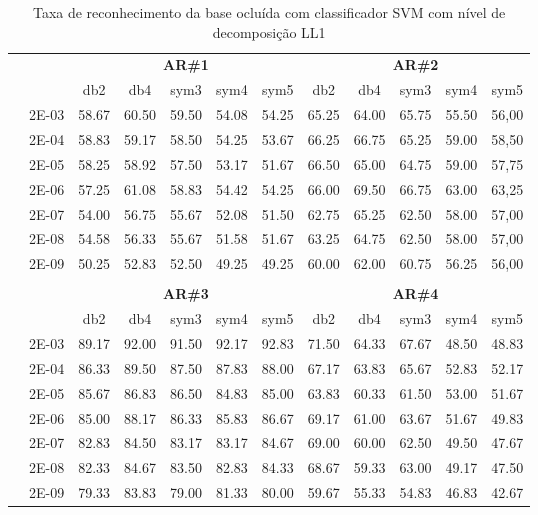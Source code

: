 \begin{table}[H]
	\centering
    \normalsize
	\caption{Taxa de reconhecimento da base ocluída com classificador SVM com nível de decomposição LL1}
	\begin{tabular}{|c|c|c c c c c|c c c c c|}
\cline{3-12}
\multicolumn{2}{c|}{\multirow{2}{*}{}} & \multicolumn{5}{c|}{\textbf{AR\#1}}  & \multicolumn{5}{c|}{\textbf{AR\#2}} \\\cline{3-12}

\multicolumn{2}{c|}{}  & db2 & db4 & sym3 & sym4 & sym5 & db2 & db4& sym3 & sym4 & sym5 \\\hline
\multicolumn{1}{|c|}{ \multirow{6}{*}{\rotatebox[origin=c]{90}{\textbf{Gamma}}} }
&2E-03&	58.67&	60.50&	59.50	&54.08&	54.25&	65.25	&64.00 &	65.75&	55.50&	56,00	\\\cline{2-12}
&2E-04&	58.83&	59.17&	58.50	&54.25&	53.67&	66.25	&66.75 &	65.25&	59.00&	58,50	\\\cline{2-12}
&2E-05&	58.25&	58.92&	57.50	&53.17&	51.67&	66.50	&65.00 &	64.75&	59.00&	57,75	\\\cline{2-12}
&2E-06&	57.25&	61.08&	58.83	&54.42&	54.25&	66.00	&69.50 &	66.75&	63.00&	63,25	\\\cline{2-12}
&2E-07&	54.00&	56.75&	55.67	&52.08&	51.50&	62.75	&65.25 &	62.50&	58.00&	57,00	\\\cline{2-12}
&2E-08&	54.58&	56.33&	55.67	&51.58&	51.67&	63.25	&64.75 &	62.50&	58.00&	57,00	\\\cline{2-12}
&2E-09&	50.25&	52.83&	52.50	&49.25&	49.25&	60.00	&62.00 &	60.75&	56.25&	56,00	
	
\\ \midrule
\multicolumn{12}{c}{}\\ 

\cline{3-12}
\multicolumn{2}{c}{} & \multicolumn{5}{|c|}{\textbf{AR\#3}}  & \multicolumn{5}{c|}{\textbf{AR\#4}} \\\cline{3-12}
\multicolumn{2}{c}{}  & \multicolumn{1}{|c}{db2} & db4 & sym3 & sym4 & sym5 & db2 & db4& sym3 & sym4 & sym5 \\\hline
\multicolumn{1}{|c|}{ \multirow{6}{*}{\rotatebox[origin=c]{90}{\textbf{Gamma}}} }
&2E-03&	89.17&	92.00&	91.50&	92.17&	92.83&	71.50	&64.33&	67.67&	48.50&	48.83	\\\cline{2-12}
&2E-04&	86.33&	89.50&	87.50&	87.83&	88.00&	67.17	&63.83&	65.67&	52.83&	52.17	\\\cline{2-12}
&2E-05&	85.67&	86.83&	86.50&	84.83&	85.00&	63.83	&60.33&	61.50&	53.00&	51.67	\\\cline{2-12}
&2E-06&	85.00&	88.17&	86.33&	85.83&	86.67&	69.17	&61.00&	63.67&	51.67&	49.83	\\\cline{2-12}
&2E-07&	82.83&	84.50&	83.17&	83.17&	84.67&	69.00	&60.00&	62.50&	49.50&	47.67	\\\cline{2-12}
&2E-08&	82.33&	84.67&	83.50&	82.83&	84.33&	68.67	&59.33&	63.00&	49.17&	47.50	\\\cline{2-12}
&2E-09&	79.33&	83.83&	79.00&	81.33&	80.00&	59.67	&55.33&	54.83&	46.83&	42.67	
	
\\\midrule
\end{tabular}
\end{table}




